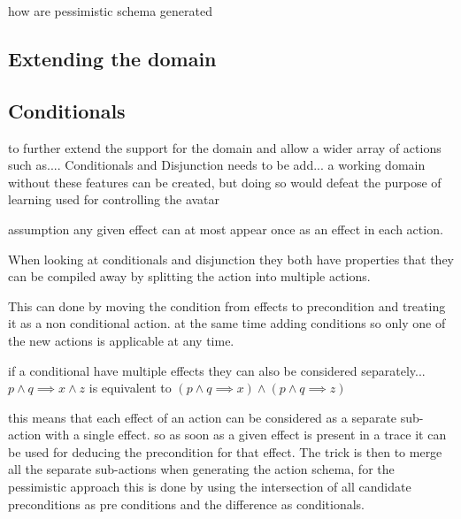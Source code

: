 how are pessimistic schema generated
\subsection{Extending the domain}
\subsection{Conditionals}	

	to further extend the support for the domain and allow a wider array of actions such as.... Conditionals and Disjunction needs to be add... a working domain without these features can be created, but doing so would defeat the purpose of learning used for controlling the avatar

	assumption any given effect can at most appear once as an effect in each action.

	When looking at conditionals and disjunction they both have properties that they can be compiled away by splitting the action into multiple actions. %
	
	
	This can done by moving the condition from effects to precondition and treating it as a non conditional action. at the same time adding conditions so only one of the new actions is applicable at any time.
	
	if a conditional have multiple effects they can also be considered separately...
	$p \land q \implies x \land z$
	is equivalent to 
	$(p \land q \implies x)
	\land
	(p \land q \implies z)$
	
	
	this means that each effect of an action can be considered as a separate sub-action with a single effect. so as soon as a given effect is present in a trace it can be used for deducing the precondition for that effect. The trick is then to merge all the separate sub-actions when generating the action schema, for the pessimistic approach this is done by using the intersection of all candidate preconditions as pre conditions and the difference as conditionals.


